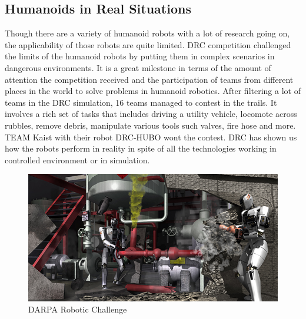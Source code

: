 \subsection{Humanoids in Real Situations}
 Though there are a variety of humanoid robots with a lot of research going on, the applicability of those robots are quite limited. DRC competition challenged the limits of the humanoid robots by putting them in complex scenarios in dangerous environments. It is a great milestone in terms of the amount of attention the competition received and the participation of teams from different places in the world to solve problems in humanoid robotics. After filtering a lot of teams in the DRC simulation, 16 teams managed to contest in the trails. It involves a rich set of tasks that includes driving a utility vehicle, locomote across rubbles, remove debris, manipulate various tools such valves, fire hose and more. TEAM Kaist with their robot DRC-HUBO wont the contest. DRC has shown us how the robots perform in reality in spite of all the technologies working in controlled environment or in simulation. 


\begin{figure}[h]
\includegraphics[scale=0.59,right]{chapters/intro/images/darpa.jpg}
\caption{DARPA Robotic Challenge}
\label{fig:darpa}
\end{figure}

